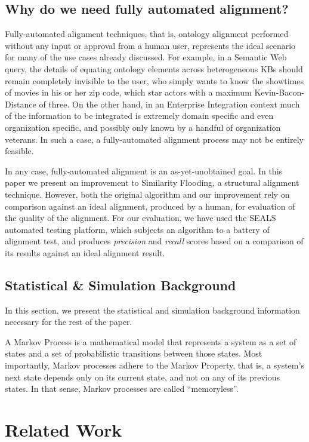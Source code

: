 \documentclass[letterpaper,twocolumn,12pt]{article}
\begin{document}
\subsection{Why do we need fully automated alignment?}
\label{subsec:automated}
Fully-automated alignment techniques, that is, ontology alignment performed without
any input or approval from a human user, represents the ideal scenario for many
of the use cases already discussed. For example, in a Semantic Web query, the details
of equating ontology elements across heterogeneous KBs should remain completely
invisible to the user, who simply wants to know the showtimes of movies in his or her
zip code, which star actors with a maximum Kevin-Bacon-Distance of three.
On the other hand, in an Enterprise Integration context much of the information to
be integrated is extremely domain specific and even organization specific, and possibly
only known by a handful of organization veterans. In such a case, a fully-automated
alignment process may not be entirely feasible.

In any case, fully-automated alignment is an as-yet-unobtained goal. In this paper
we present an improvement to Similarity Flooding, a structural alignment technique. However,
both the original algorithm and our improvement rely on comparison against an ideal
alignment, produced by a human, for evaluation of the quality of the alignment. For our
evaluation, we have used the SEALS automated testing platform, which subjects an algorithm
to a battery of alignment test, and produces \textit{precision} and \textit{recall} scores
based on a comparison of its results against an ideal alignment result.


\subsection{Statistical \& Simulation Background}
\label{subsec:stat}
In this section, we present the statistical and simulation background information
necessary for the rest of the paper.

A Markov Process is a mathematical model that represents a system as a set of states
and a set of probabilistic transitions between those states. Most importantly, Markov 
processes adhere to the Markov Property, that is, a system's next state depends only
on its current state, and not on any of its previous states. In that sense, Markov
processes are called ``memoryless''.


\section{Related Work}
\end{document}
